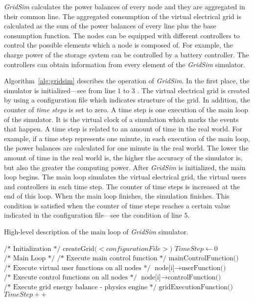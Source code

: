 {\it GridSim} calculates the power balances of every node and they are aggregated in their common line.
The aggregated consumption of the virtual electrical grid is calculated as the sum of the power balances of every line plus the base consumption function.
The nodes can be equipped with different controllers to control the possible elements which a node is composed of.
For example, the charge power of the storage system can be controlled by a battery controller. %
The controllers can obtain information from every element of the {\it GridSim} simulator.

Algorithm~\ref{alg:gridsim} describes the operation of {\it GridSim}.
In the first place, the simulator is initialized---see from line $1$ to $3$ .
The virtual electrical grid is created by using a configuration file which indicates structure of the grid.
In addition, the counter of {\it time steps} is set to zero.
A time step is one execution of the main loop of the simulator.
It is the virtual clock of a simulation which marks the events that happen.
A time step is related to an amount of time in the real world.
For example, if a time step represents one minute, 
in each execution of the main loop, the power balances are calculated for one minute in the real world.
The lower the amount of time in the real world is, the higher the accuracy of the simulator is, but also the greater the computing power. 
After {\it GridSim} is initialized, the main loop begins.
The main loop simulates the virtual electrical grid, the virtual users and controllers in each time step.
The counter of time steps is increased at the end of this loop.
When the main loop finishes, the simulation finishes.
This condition is satisfied when the counter of time steps reaches a certain value indicated in the configuration file---see the condition of line $5$.
\begin{algorithm}[!t]
\caption[Main loop of {\it GridSim} simulator.]{High-level description of the main loop of {\it GridSim} simulator.}\label{alg:gridsim}
\begin{algorithmic}[1]
\State $\text{/* Initialization */}$
\State $\text{createGrid($<configurationFile>$)}$ 
\State $TimeStep \gets 0$
\State $\text{/* Main Loop */}$
	\State $\text{/* Execute main control function */}$
	\State $\text{mainControlFunction()}$ 
	\State $\text{/* Execute virtual user functions on all nodes */}$
		\State $\text{node[i]$\rightarrow$userFunction()}$
	\EndFor
	\State $\text{/* Execute control functions on all nodes */}$
		\State $\text{node[i]$\rightarrow$controlFunction()}$
	\EndFor
	\State $\text{/* Execute grid energy balance - physics engine */}$
	\State $\text{gridExecutionFunction()}$
	\State $TimeStep++$
\EndWhile
\end{algorithmic}
\end{algorithm}
